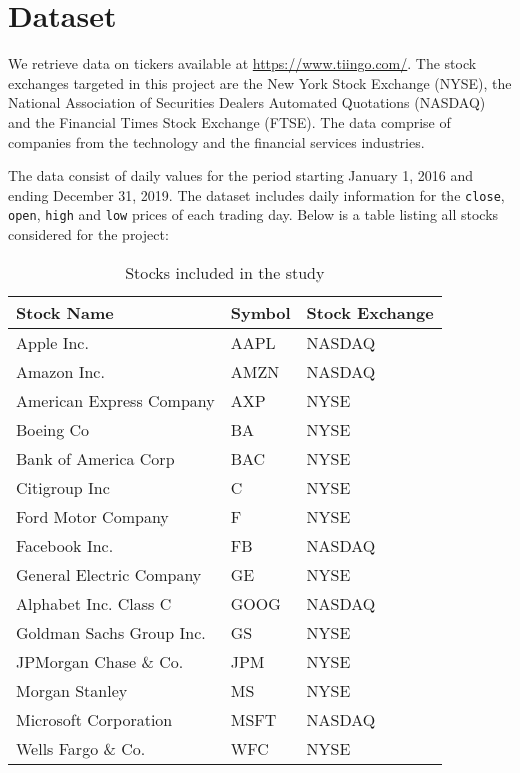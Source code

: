 \section{Dataset}
We retrieve data on tickers available at \url{https://www.tiingo.com/}. The stock exchanges targeted in this project are the New York Stock Exchange (NYSE), the National Association of Securities Dealers Automated Quotations (NASDAQ) and the Financial Times Stock Exchange (FTSE). The data comprise of companies from the technology and the financial services industries.

The data consist of daily values for the period starting January 1, 2016 and ending December 31, 2019. The dataset includes daily information for the \texttt{close}, \texttt{open}, \texttt{high} and \texttt{low} prices of each trading day. Below is a table listing all stocks considered for the project:

\begin{table}[h]
    \centering
    \begin{tabular}{|l|l|l|}
        \hline
        \textbf{Stock Name}      & \textbf{Symbol} & \textbf{Stock Exchange} \\ \hline
        Apple Inc.               & AAPL            & NASDAQ                  \\ \hline
        Amazon Inc.              & AMZN            & NASDAQ                  \\ \hline
        American Express Company & AXP             & NYSE                    \\ \hline
        Boeing Co                & BA              & NYSE                    \\ \hline
        Bank of America Corp     & BAC             & NYSE                    \\ \hline
        Citigroup Inc            & C               & NYSE                    \\ \hline
        Ford Motor Company       & F               & NYSE                    \\ \hline
        Facebook Inc.            & FB              & NASDAQ                  \\ \hline
        General Electric Company & GE              & NYSE                    \\ \hline
        Alphabet Inc. Class C    & GOOG            & NASDAQ                  \\ \hline
        Goldman Sachs Group Inc. & GS              & NYSE                    \\ \hline
        JPMorgan Chase \& Co.    & JPM             & NYSE                    \\ \hline
        Morgan Stanley           & MS              & NYSE                    \\ \hline
        Microsoft Corporation    & MSFT            & NASDAQ                  \\ \hline
        Wells Fargo \& Co.       & WFC             & NYSE                    \\ \hline
    \end{tabular}
    \caption{Stocks included in the study}
    \label{tab:stocks_included}
\end{table}

